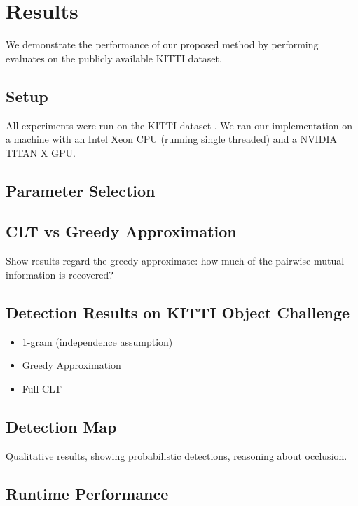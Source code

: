 \section{Results}\label{sec:results}

We demonstrate the performance of our proposed method by performing evaluates on the
publicly available KITTI dataset.

\subsection{Setup}

All experiments were run on the KITTI dataset \cite{Geiger2013IJRR}. We ran our
implementation on a machine with an Intel Xeon CPU (running single threaded) and a
NVIDIA TITAN X \ac{GPU}.

\subsection{Parameter Selection}

\aku{\ldots}

\subsection{CLT vs Greedy Approximation}

Show results regard the greedy approximate: how much of the pairwise mutual
information is recovered?

\subsection{Detection Results on KITTI Object Challenge}

\begin{itemize}
  \item 1-gram (independence assumption)
  \item Greedy Approximation
  \item Full \ac{CLT}
\end{itemize}

\subsection{Detection Map}

Qualitative results, showing probabilistic detections, reasoning about
occlusion.

\subsection{Runtime Performance}


